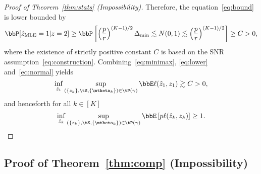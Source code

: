 \documentclass[lettersize,onecolumn,journal]{IEEEtran}
\theoremstyle{definition}
\theoremstyle{definition}
\begin{document}
\begin{proof}[Proof of Theorem~\ref{thm:stats} (Impossibility)]
Therefore, the equation~\eqref{eq:bound} is lower bounded by
\begin{equation}\label{eq:normal}
\bbP[\hat z_{\text{MLE}}=1|z=2] \geq \bbP\left[ \left({p\over r}\right)^{(K-1)/2}\Delta_{\min}\lesssim N(0,1)\lesssim  \left({p\over r}\right)^{(K-1)/2} \right]\geq C>0,
\end{equation}
 where the existence of strictly positive constant $C$ is based on the SNR assumption~\eqref{eq:construction}. Combining~\eqref{eq:minimax}, \eqref{eq:lower} and~\eqref{eq:normal} yields
\[
\inf_{\hat z_1}\sup_{(\{z_k\},\tS,\{\mtheta_k\})\in \tP(\gamma)}\bbE\ell(\hat z_1, z_1)\gtrsim C>0, 
\]
and henceforth for all $k \in [K]$
\[
\inf_{\hat z_k}\sup_{(\{z_k\},\tS,\{\mtheta_k\})\in \tP(\gamma)}\bbE \left[p\ell(\hat z_k, z_k)\right]\geq 1.
\]

{
\color{blue}


}
\end{proof}



\subsection{Proof of Theorem~\ref{thm:comp} (Impossibility)}\label{sec:compprove1}
\end{document}
